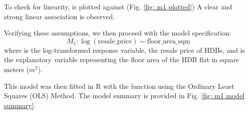 \begin{figure}
    
\end{figure}

To check for linearity,  is plotted against  (Fig. \ref{fig: m1 plotted}) A clear and strong linear association is observed.

Verifying these assumptions, we then proceed with the model specification:
\[M_1: \log(\text{resale\_price}) \sim \text{floor\_area\_sqm}\]
where  is the log-transformed response variable, the resale price of HDBs, and \newline {} is the explanatory variable representing the floor area of the HDB flat in square meters ($m^2$).

This model was then fitted in R with the  function using the Ordinary Least Squares (OLS) Method. The model summary is provided in Fig. \ref{fig: m1 model summary}.

